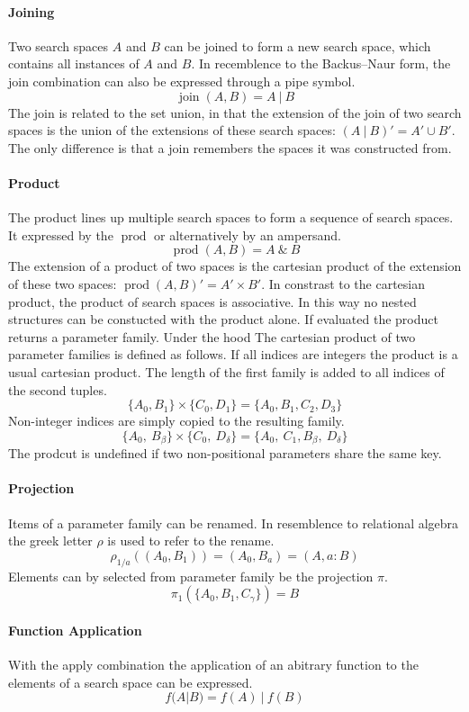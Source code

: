 \documentclass[english]{article}
\begin{document}
\paragraph{Joining}
Two search spaces $A$ and $B$ can be joined to form a new search space, which contains all instances of $A$ and $B$. In recemblence to the Backus–Naur form, the join combination can also be expressed through a pipe symbol.
$$ \operatorname{join}(A, B) = A\ |\ B $$
The join is related to the set union, in that the extension of the join of two search spaces is the union of the extensions of these search spaces: $(A\ |\ B)' = A' \cup B'$. The only difference is that a join remembers the spaces it was constructed from.

\paragraph{Product}
The product lines up multiple search spaces to form a sequence of search spaces. It expressed by the $\operatorname{prod}$ or alternatively by an ampersand.
$$\operatorname{prod}(A,B) = A\ \&\ B$$
The extension of a product of two spaces is the cartesian product of the extension of these two spaces: $\operatorname{prod}(A,B)' = A' \times B'$. In constrast to the cartesian product, the product of search spaces is associative.  In this way no nested structures can be constucted with the product alone. If evaluated the product returns a parameter family. Under the hood
The cartesian product of two parameter families is defined as follows. If all indices are integers the product is a usual cartesian product. The length of the first family is added to all indices of the second tuples.
$$\{A_0, B_1\} \times \{C_0, D_1\} = \{A_0, B_1, C_2, D_3\}$$
Non-integer indices are simply copied to the resulting family.
$$\{A_0,\ B_\beta\} \times \{C_0,\ D_\delta\} = \{A_0,\ C_1, B_\beta,\ D_\delta\}$$
The prodcut is undefined if two non-positional parameters share the same key.

\paragraph{Projection}
Items of a parameter family can be renamed. In resemblence to relational algebra the greek letter $\rho$ is used to refer to the rename.
$$\rho_{1/a}((A_{0}, B_{1})) = (A_{0}, B_{a}) = (A, a:B)$$
Elements can by selected from parameter family be the projection $\pi$.
$$\pi_1(\{A_0, B_1, C_\gamma\}) = B$$

\paragraph{Function Application}
With the apply combination the application of an abitrary function to the elements of a search space can be expressed.
$$ f(A | B) = f(A)\ |\ f(B) $$
\end{document}
